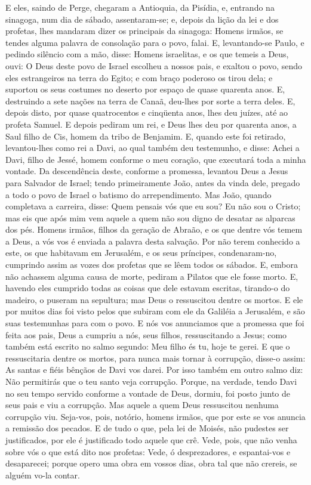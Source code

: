 E eles, saindo de Perge, chegaram a Antioquia, da Pisídia, e,
entrando na sinagoga, num dia de sábado, assentaram-se; e,
depois da lição da lei e dos profetas, lhes mandaram dizer os
principais da sinagoga: Homens irmãos, se tendes alguma palavra de
consolação para o povo, falai. E, levantando-se Paulo, e
pedindo silêncio com a mão, disse: Homens israelitas, e os que
temeis a Deus, ouvi: O Deus deste povo de Israel escolheu a
nossos pais, e exaltou o povo, sendo eles estrangeiros na terra do
Egito; e com braço poderoso os tirou dela; e suportou os seus
costumes no deserto por espaço de quase quarenta anos. E,
destruindo a sete nações na terra de Canaã, deu-lhes por sorte a
terra deles. E, depois disto, por quase quatrocentos e
cinqüenta anos, lhes deu juízes, até ao profeta Samuel. E
depois pediram um rei, e Deus lhes deu por quarenta anos, a Saul
filho de Cis, homem da tribo de Benjamim. E, quando este foi
retirado, levantou-lhes como rei a Davi, ao qual também deu
testemunho, e disse: Achei a Davi, filho de Jessé, homem conforme o
meu coração, que executará toda a minha vontade. Da
descendência deste, conforme a promessa, levantou Deus a Jesus para
Salvador de Israel; tendo primeiramente João, antes da vinda
dele, pregado a todo o povo de Israel o batismo do arrependimento.
Mas João, quando completava a carreira, disse: Quem pensais
vós que eu sou? Eu não sou o Cristo; mas eis que após mim vem aquele
a quem não sou digno de desatar as alparcas dos pés. Homens
irmãos, filhos da geração de Abraão, e os que dentre vós temem a
Deus, a vós vos é enviada a palavra desta salvação. Por não
terem conhecido a este, os que habitavam em Jerusalém, e os seus
príncipes, condenaram-no, cumprindo assim as vozes dos profetas que
se lêem todos os sábados. E, embora não achassem alguma causa
de morte, pediram a Pilatos que ele fosse morto. E, havendo
eles cumprido todas as coisas que dele estavam escritas, tirando-o
do madeiro, o puseram na sepultura; mas Deus o ressuscitou
dentre os mortos. E ele por muitos dias foi visto pelos que
subiram com ele da Galiléia a Jerusalém, e são suas testemunhas para
com o povo. E nós vos anunciamos que a promessa que foi feita
aos pais, Deus a cumpriu a nós, seus filhos, ressuscitando a Jesus;
como também está escrito no salmo segundo: Meu filho és tu,
hoje te gerei. E que o ressuscitaria dentre os mortos, para
nunca mais tornar à corrupção, disse-o assim: As santas e fiéis
bênçãos de Davi vos darei. Por isso também em outro salmo
diz: Não permitirás que o teu santo veja corrupção. Porque,
na verdade, tendo Davi no seu tempo servido conforme a vontade de
Deus, dormiu, foi posto junto de seus pais e viu a corrupção.
Mas aquele a quem Deus ressuscitou nenhuma corrupção viu.
Seja-vos, pois, notório, homens irmãos, que por este se vos
anuncia a remissão dos pecados. E de tudo o que, pela lei de
Moisés, não pudestes ser justificados, por ele é justificado todo
aquele que crê. Vede, pois, que não venha sobre vós o que
está dito nos profetas: Vede, ó desprezadores, e espantai-vos
e desaparecei; porque opero uma obra em vossos dias, obra tal que
não crereis, se alguém vo-la contar.

